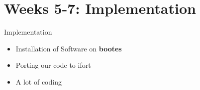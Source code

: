 \documentclass{beamer}
\begin{document}

    \section{Weeks 5-7: Implementation}

    \begin{frame}{Implementation}
    \begin{itemize}[<+-|alert@+>]
        \item Installation of Software on \bf{bootes}
        \item Porting our code to ifort
        \item A lot of coding
    \end{itemize}
    \end{frame}
\end{document}
